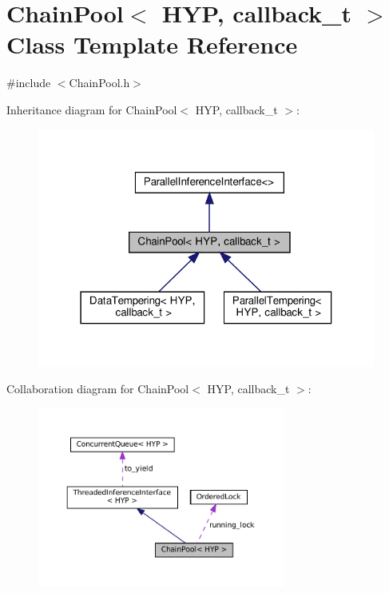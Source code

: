 \hypertarget{class_chain_pool}{}\section{Chain\+Pool$<$ H\+YP, callback\+\_\+t $>$ Class Template Reference}
\label{class_chain_pool}


{\ttfamily \#include $<$Chain\+Pool.\+h$>$}



Inheritance diagram for Chain\+Pool$<$ H\+YP, callback\+\_\+t $>$\+:
\nopagebreak
\begin{figure}[H]
\begin{center}
\leavevmode
\includegraphics[width=316pt]{class_chain_pool__inherit__graph}
\end{center}
\end{figure}


Collaboration diagram for Chain\+Pool$<$ H\+YP, callback\+\_\+t $>$\+:
\nopagebreak
\begin{figure}[H]
\begin{center}
\leavevmode
\includegraphics[width=231pt]{class_chain_pool__coll__graph}
\end{center}
\end{figure}
